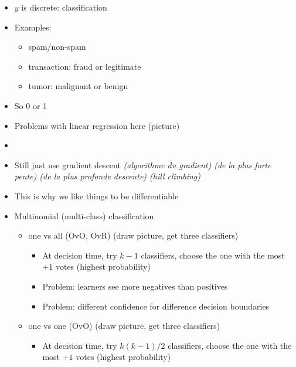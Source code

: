 




\begin{itemize}
\item $y$ is discrete: classification
\item Examples:
  \begin{itemize}
  \item spam/non-spam
  \item transaction: fraud or legitimate
  \item tumor: malignant or benign
  \end{itemize}
\item So 0 or 1
\item Problems with linear regression here (picture)
\item {}
\end{itemize}

\begin{itemize}
\item Still just use gradient descent \textit{(algorithme du gradient) (de la plus forte pente) (de la plus profonde descente) (hill climbing)}
\item This is why we like things to be differentiable
\item Multinomial (multi-class) classification
  \begin{itemize}
  \item one vs all (OvO, OvR) (draw picture, get three classifiers)
    \begin{itemize}
    \item At decision time, try $k-1$ classifiers, choose the one with
      the most $+1$ votes (highest probability)
    \item Problem: learners see more negatives than positives
    \item Problem: different confidence for difference decision boundaries
    \end{itemize}
  \item one vs one (OvO) (draw picture, get three classifiers)
    \begin{itemize}
    \item At decision time, try $k(k-1)/2$ classifiers, choose the one with
      the most $+1$ votes (highest probability)
    \end{itemize}

  \end{itemize}

\end{itemize}

